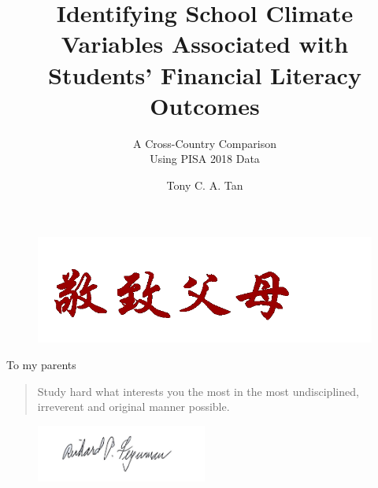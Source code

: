 \documentclass[a4paper,11pt,UKenglish,twoside,openright]{report}\usepackage[]{graphicx}\usepackage[]{color}
\title{Identifying School Climate Variables Associated with Students' Financial Literacy Outcomes}
\subtitle{A Cross-Country Comparison\\Using {PISA} 2018 Data}
\author{Tony C. A. Tan}
\begin{document}
\duoforside[
    fac={Faculty of Educational Sciences},
    dept={Centre for Educational Measurement},
    program={Assessment, Measurement and Evaluation},
    date={Spring 2021},
    short
]


\thispagestyle{empty}

\vspace*{\fill}
\begin{figure}[h]
    \includegraphics[width=\textwidth]{./Figures/To-parents.png}
\end{figure}
\begin{flushright}
To my parents
\end{flushright}
\vspace*{\fill}
\clearpage
\thispagestyle{empty}

\vspace*{3cm}

\begin{quote}
    \calligra\huge      %
\hyphenchar{}     %
Study hard what interests you the most in the most undisciplined, irreverent and original manner possible.
\end{quote}

\begin{figure}[h]
    \flushright
    \includegraphics[width=0.50\textwidth]{./Figures/Feynman-Signature.jpg}
\end{figure}
\vspace*{-1cm}
\end{document}
